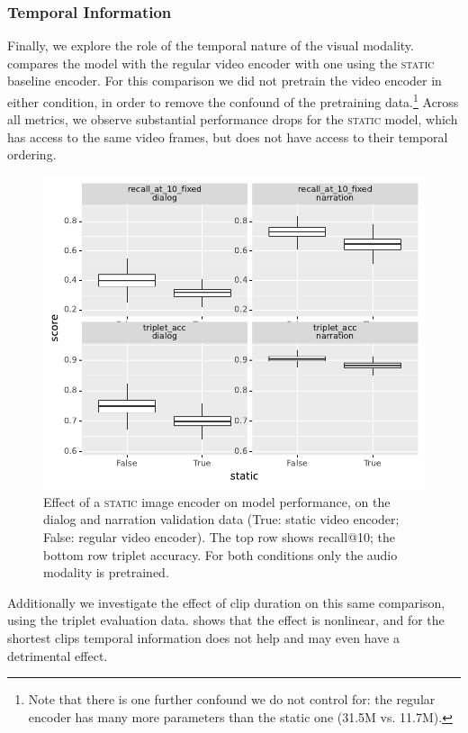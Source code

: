 \subsubsection{Temporal Information}
Finally, we explore the role of the temporal nature of the visual
modality.   compares the model with the regular video
encoder with one using the \textsc{static} baseline encoder.  For this
comparison we did not pretrain the video encoder in either condition,
in order to remove the confound of the pretraining data.\footnote{Note
  that there is one further confound we do not control for: the
  regular encoder has many more parameters than the {\sc static} one (31.5M vs. 11.7M).}
Across all
metrics, we observe substantial performance drops for the
\textsc{static} model, which has access to the same video frames, but
does not have access to their temporal ordering.
\begin{figure}[htb]
  \centering
  \includegraphics[width=\columnwidth]{results/ablations/static.pdf}
  \caption{Effect of a \textsc{static} image encoder on model
    performance, on the dialog and narration validation data (True:
    static video encoder; False: regular video encoder). The top row
    shows recall@10; the bottom row triplet accuracy. For both conditions only
    the audio modality is pretrained.}
  \label{fig:static}
\end{figure}
Additionally we investigate the effect of clip duration on this same
comparison, using the triplet evaluation
data.  shows that the effect is nonlinear,
and for the shortest clips temporal information does not
help and may even have a detrimental effect.


